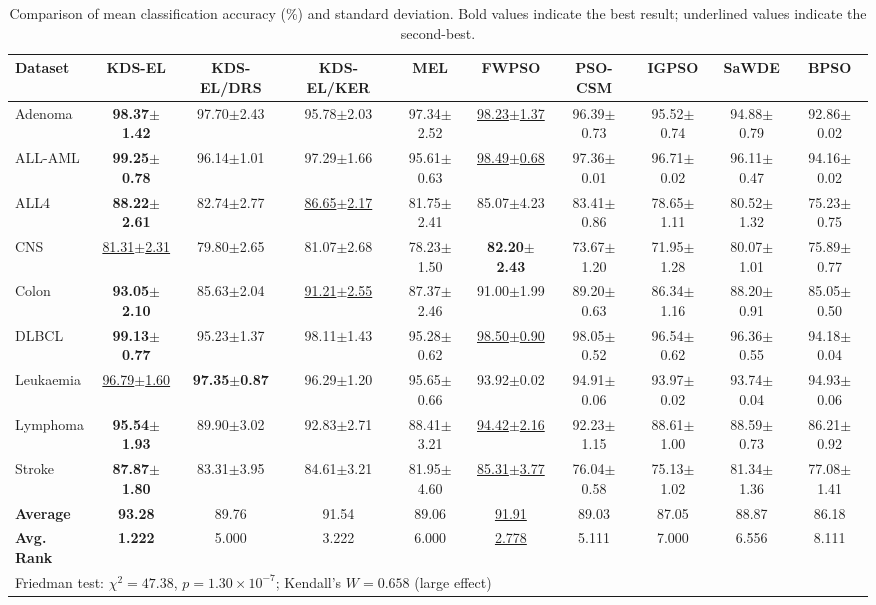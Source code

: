 \documentclass[a4paper,fleqn]{cas-dc}
\begin{document}
\begin{sloppypar}
\begin{table}[t]
\centering
\caption{Comparison of mean classification accuracy (\%) and standard deviation.
Bold values indicate the best result; underlined values indicate the second-best.}
\label{tab:accuracy}
\setlength{\tabcolsep}{3.5pt}
\begin{tabular}{lccccccccc}
\toprule
\textbf{Dataset} & \textbf{KDS-EL} & \textbf{KDS-EL/DRS} & \textbf{KDS-EL/KER} & \textbf{MEL} & \textbf{FWPSO} & \textbf{PSO-CSM} & \textbf{IGPSO} & \textbf{SaWDE} & \textbf{BPSO} \\
\midrule
Adenoma & \textbf{98.37$\pm$1.42} & 97.70$\pm$2.43 & 95.78$\pm$2.03 & 97.34$\pm$2.52 & \underline{98.23$\pm$1.37} & 96.39$\pm$0.73 & 95.52$\pm$0.74 & 94.88$\pm$0.79 & 92.86$\pm$0.02 \\
ALL-AML & \textbf{99.25$\pm$0.78} & 96.14$\pm$1.01 & 97.29$\pm$1.66 & 95.61$\pm$0.63 & \underline{98.49$\pm$0.68} & 97.36$\pm$0.01 & 96.71$\pm$0.02 & 96.11$\pm$0.47 & 94.16$\pm$0.02 \\
ALL4 & \textbf{88.22$\pm$2.61} & 82.74$\pm$2.77 & \underline{86.65$\pm$2.17} & 81.75$\pm$2.41 & 85.07$\pm$4.23 & 83.41$\pm$0.86 & 78.65$\pm$1.11 & 80.52$\pm$1.32 & 75.23$\pm$0.75 \\
CNS & \underline{81.31$\pm$2.31} & 79.80$\pm$2.65 & 81.07$\pm$2.68 & 78.23$\pm$1.50 & \textbf{82.20$\pm$2.43} & 73.67$\pm$1.20 & 71.95$\pm$1.28 & 80.07$\pm$1.01 & 75.89$\pm$0.77 \\
Colon & \textbf{93.05$\pm$2.10} & 85.63$\pm$2.04 & \underline{91.21$\pm$2.55} & 87.37$\pm$2.46 & 91.00$\pm$1.99 & 89.20$\pm$0.63 & 86.34$\pm$1.16 & 88.20$\pm$0.91 & 85.05$\pm$0.50 \\
DLBCL & \textbf{99.13$\pm$0.77} & 95.23$\pm$1.37 & 98.11$\pm$1.43 & 95.28$\pm$0.62 & \underline{98.50$\pm$0.90} & 98.05$\pm$0.52 & 96.54$\pm$0.62 & 96.36$\pm$0.55 & 94.18$\pm$0.04 \\
Leukaemia & \underline{96.79$\pm$1.60} & \textbf{97.35$\pm$0.87} & 96.29$\pm$1.20 & 95.65$\pm$0.66 & 93.92$\pm$0.02 & 94.91$\pm$0.06 & 93.97$\pm$0.02 & 93.74$\pm$0.04 & 94.93$\pm$0.06 \\
Lymphoma & \textbf{95.54$\pm$1.93} & 89.90$\pm$3.02 & 92.83$\pm$2.71 & 88.41$\pm$3.21 & \underline{94.42$\pm$2.16} & 92.23$\pm$1.15 & 88.61$\pm$1.00 & 88.59$\pm$0.73 & 86.21$\pm$0.92 \\
Stroke & \textbf{87.87$\pm$1.80} & 83.31$\pm$3.95 & 84.61$\pm$3.21 & 81.95$\pm$4.60 & \underline{85.31$\pm$3.77} & 76.04$\pm$0.58 & 75.13$\pm$1.02 & 81.34$\pm$1.36 & 77.08$\pm$1.41 \\
\midrule
\textbf{Average} & \textbf{93.28} & 89.76 & 91.54 & 89.06 & \underline{91.91} & 89.03 & 87.05 & 88.87 & 86.18 \\
\textbf{Avg. Rank} & \textbf{1.222} & 5.000 & 3.222 & 6.000 & \underline{2.778} & 5.111 & 7.000 & 6.556 & 8.111 \\
\midrule
\multicolumn{10}{l}{Friedman test: $\chi^2=47.38$, $p=1.30\times10^{-7}$; Kendall's $W=0.658$ (large effect)} \\
\bottomrule
\end{tabular}
\end{table}


\end{sloppypar}
\end{document}
